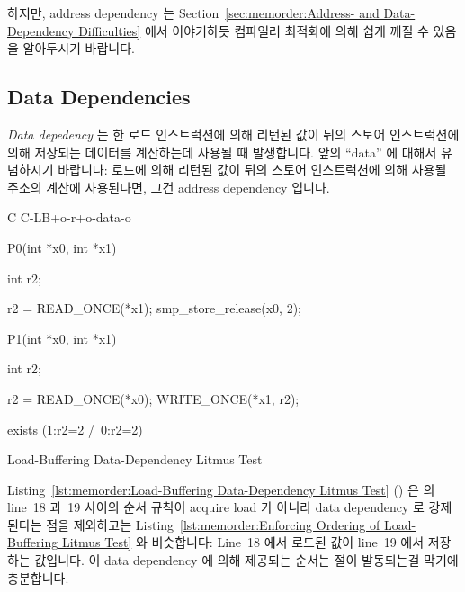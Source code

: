 하지만, address dependency 는
Section~\ref{sec:memorder:Address- and Data-Dependency Difficulties} 에서
이야기하듯 컴파일러 최적화에 의해 쉽게 깨질 수 있음을 알아두시기 바랍니다.

\subsection{Data Dependencies}
\label{sec:memorder:Data Reordering}

\emph{Data depedency} 는 한 로드 인스트럭션에 의해 리턴된 값이 뒤의 스토어
인스트럭션에 의해 저장되는 데이터를 계산하는데 사용될 때 발생합니다.
앞의 ``data'' 에 대해서 유념하시기 바랍니다: 로드에 의해 리턴된 값이 뒤의
스토어 인스트럭션에 의해 사용될 주소의 계산에 사용된다면, 그건 address
dependency 입니다.

\begin{listing}[tbp]
{ \scriptsize
\begin{verbbox}[\LstLineNo]
C C-LB+o-r+o-data-o
{
}

P0(int *x0, int *x1)
{
  int r2;

  r2 = READ_ONCE(*x1);
  smp_store_release(x0, 2);
}


P1(int *x0, int *x1)
{
  int r2;

  r2 = READ_ONCE(*x0);
  WRITE_ONCE(*x1, r2);
}

exists (1:r2=2 /\ 0:r2=2)
\end{verbbox}
}
\centering
\theverbbox
\caption{Load-Buffering Data-Dependency Litmus Test}
\label{lst:memorder:Load-Buffering Data-Dependency Litmus Test}
\end{listing}

Listing~\ref{lst:memorder:Load-Buffering Data-Dependency Litmus Test}
()
은  의 line~18 과~19 사이의 순서 규칙이 acquire load 가 아니라 data
dependency 로 강제된다는 점을 제외하고는
Listing~\ref{lst:memorder:Enforcing Ordering of Load-Buffering Litmus Test}
와 비슷합니다:
Line~18 에서 로드된 값이 line~19 에서 저장하는 값입니다.
이 data dependency 에 의해 제공되는 순서는  절이 발동되는걸 막기에
충분합니다.
\iffalse

